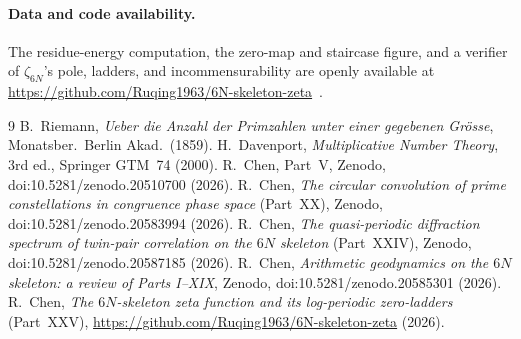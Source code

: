 \documentclass[11pt,a4paper]{article}
\begin{document}
\paragraph{Data and code availability.}
The residue-energy computation, the zero-map and staircase figure, and a verifier of
$\zeta_{6N}$'s pole, ladders, and incommensurability are openly available at
\url{https://github.com/Ruqing1963/6N-skeleton-zeta}~\cite{repo}.

\begin{thebibliography}{9}
 B.~Riemann, \emph{Ueber die Anzahl der Primzahlen unter einer
gegebenen Gr\"osse}, Monatsber.\ Berlin Akad.\ (1859).
 H.~Davenport, \emph{Multiplicative Number Theory}, 3rd ed.,
Springer GTM~74 (2000).
 R.~Chen, Part~V, Zenodo, doi:10.5281/zenodo.20510700 (2026).
 R.~Chen, \emph{The circular convolution of prime constellations in
congruence phase space} (Part~XX), Zenodo, doi:10.5281/zenodo.20583994 (2026).
 R.~Chen, \emph{The quasi-periodic diffraction spectrum of
twin-pair correlation on the $6N$ skeleton} (Part~XXIV), Zenodo,
doi:10.5281/zenodo.20587185 (2026).
 R.~Chen, \emph{Arithmetic geodynamics on the $6N$ skeleton: a
review of Parts I--XIX}, Zenodo, doi:10.5281/zenodo.20585301 (2026).
 R.~Chen, \emph{The $6N$-skeleton zeta function and its log-periodic
zero-ladders} (Part~XXV),
\url{https://github.com/Ruqing1963/6N-skeleton-zeta} (2026).
\end{thebibliography}
\end{document}
